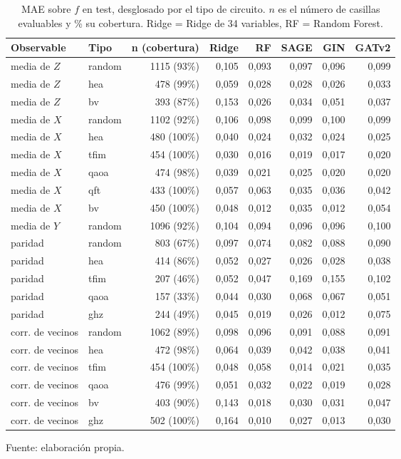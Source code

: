 \begin{table}[htbp]
    \centering
    {\footnotesize
    \begin{tabular}{@{}llrrrrrr@{}}
        \toprule
        \textbf{Observable} & \textbf{Tipo} & \textbf{n (cobertura)} & \textbf{Ridge} & \textbf{RF} & \textbf{SAGE} & \textbf{GIN} & \textbf{GATv2} \\
        \midrule
        media de $Z$ & random & 1115 (93\%) & 0,105 & 0,093 & 0,097 & 0,096 & 0,099 \\
        media de $Z$ & hea & 478 (99\%) & 0,059 & 0,028 & 0,028 & 0,026 & 0,033 \\
        media de $Z$ & bv & 393 (87\%) & 0,153 & 0,026 & 0,034 & 0,051 & 0,037 \\
        media de $X$ & random & 1102 (92\%) & 0,106 & 0,098 & 0,099 & 0,100 & 0,099 \\
        media de $X$ & hea & 480 (100\%) & 0,040 & 0,024 & 0,032 & 0,024 & 0,025 \\
        media de $X$ & tfim & 454 (100\%) & 0,030 & 0,016 & 0,019 & 0,017 & 0,020 \\
        media de $X$ & qaoa & 474 (98\%) & 0,039 & 0,021 & 0,025 & 0,020 & 0,020 \\
        media de $X$ & qft & 433 (100\%) & 0,057 & 0,063 & 0,035 & 0,036 & 0,042 \\
        media de $X$ & bv & 450 (100\%) & 0,048 & 0,012 & 0,035 & 0,012 & 0,054 \\
        media de $Y$ & random & 1096 (92\%) & 0,104 & 0,094 & 0,096 & 0,096 & 0,100 \\
        paridad & random & 803 (67\%) & 0,097 & 0,074 & 0,082 & 0,088 & 0,090 \\
        paridad & hea & 414 (86\%) & 0,052 & 0,027 & 0,026 & 0,028 & 0,038 \\
        paridad & tfim & 207 (46\%) & 0,052 & 0,047 & 0,169 & 0,155 & 0,102 \\
        paridad & qaoa & 157 (33\%) & 0,044 & 0,030 & 0,068 & 0,067 & 0,051 \\
        paridad & ghz & 244 (49\%) & 0,045 & 0,019 & 0,026 & 0,012 & 0,075 \\
        corr. de vecinos & random & 1062 (89\%) & 0,098 & 0,096 & 0,091 & 0,088 & 0,091 \\
        corr. de vecinos & hea & 472 (98\%) & 0,064 & 0,039 & 0,042 & 0,038 & 0,041 \\
        corr. de vecinos & tfim & 454 (100\%) & 0,048 & 0,058 & 0,014 & 0,021 & 0,035 \\
        corr. de vecinos & qaoa & 476 (99\%) & 0,051 & 0,032 & 0,022 & 0,019 & 0,028 \\
        corr. de vecinos & bv & 403 (90\%) & 0,143 & 0,018 & 0,030 & 0,031 & 0,047 \\
        corr. de vecinos & ghz & 502 (100\%) & 0,164 & 0,010 & 0,027 & 0,013 & 0,030 \\
        \bottomrule
    \end{tabular}}

    \caption{MAE sobre $f$ en test, desglosado por el tipo de circuito. $n$ es el número de casillas evaluables y \% su cobertura. Ridge = Ridge de 34 variables, RF = Random Forest.}
    \label{tab:v3_tipo_mae}

    {\footnotesize Fuente: elaboración propia.}
\end{table}
